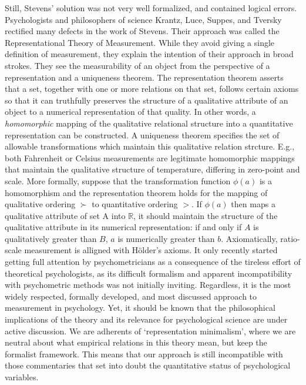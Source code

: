 \documentclass[utf8]{FrontiersinVancouver}
\begin{document}
Still, Stevens' solution was not very well formalized, and contained logical errors. Psychologists and philosophers of science Krantz, Luce, Suppes, and Tversky rectified many defects in the work of Stevens. Their approach was called the Representational Theory of Measurement. While they avoid giving a single definition of measurement, they explain the intention of their approach in broad strokes. They see the measurability of an object from the perspective of a representation and a uniqueness theorem. The representation theorem asserts that a set, together with one or more relations on that set, follows certain axioms so that it can truthfully preserves the structure of a qualitative attribute of an object to a numerical representation of that quality. In other words, a \textit{homomorphic} mapping of the qualitative relational structure into a quantitative representation can be constructed. A uniqueness theorem specifies the set of allowable transformations which maintain this qualitative relation strcture. E.g., both Fahrenheit or Celsius measurements are legitimate homomorphic mappings that maintain the qualitative structure of temperature, differing in zero-point and scale. More formally, suppose that the transformation function $\phi(a)$ is a homomorphism and the representation theorem holds for the mapping of qualitative ordering $\succ$ to quantitative ordering $>$. If $\phi(a)$ then maps a qualitative attribute of set A into $\mathbb{R}$, it should maintain the structure of the qualitative attribute in its numerical representation: if and only if $A$ is qualitatively greater than $B$, $a$ is numerically greater than $b$. Axiomatically, ratio-scale measurement is alligned with Hölder's axioms. It only recently started getting full attention by psychometricians as a consequence of the tireless effort of theoretical psychologists, as its difficult formalism and apparent incompatibility with psychometric methods was not initially inviting. Regardless, it is the most widely respected, formally developed, and most discussed approach to measurement in psychology. Yet, it should be known that the philosophical implications of the theory and its relevance for psychological science are under active discussion. We are adherents of `representation minimalism', where we are neutral about what empirical relations in this theory mean, but keep the formalist framework. This means that our approach is still incompatible with those commentaries that set into doubt the quantitative status of psychological variables. 
\end{document}
